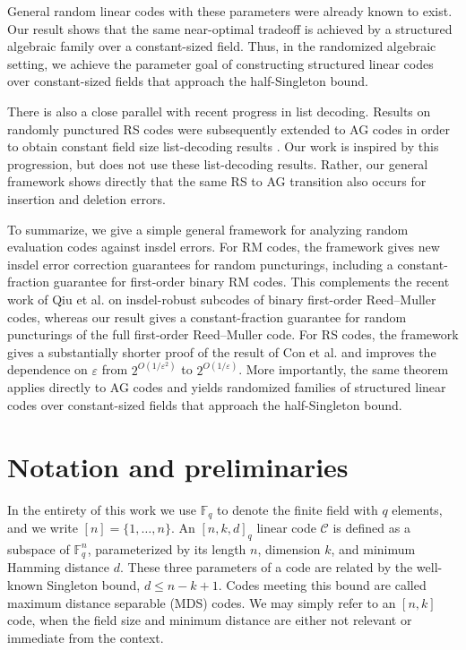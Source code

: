 \documentclass[draft, onecolumn, 11pt]{IEEEtran}
\newcommand{\F}{\mathbb{F}}
\begin{document}
General random linear codes with these parameters were already known to exist. Our result shows that the same near-optimal tradeoff is achieved by a structured algebraic family over a constant-sized field. Thus, in the randomized algebraic setting, we achieve the parameter goal of constructing structured linear codes over constant-sized fields that approach the half-Singleton bound.

There is also a close parallel with recent progress in list decoding. Results on randomly punctured RS codes were subsequently extended to AG codes in order to obtain constant field size list-decoding results \cite{brakensiek2024ag}. Our work is inspired by this progression, but does not use these list-decoding results. Rather, our general framework shows directly that the same RS to AG transition also occurs for insertion and deletion errors.

To summarize, we give a simple general framework for analyzing random evaluation codes against insdel errors. For RM codes, the framework gives new insdel error correction guarantees for random puncturings, including a constant-fraction guarantee for first-order binary RM codes. This complements the recent work of Qiu et al. \cite{qiu2026binary} on insdel-robust subcodes of binary first-order Reed--Muller codes, whereas our result gives a constant-fraction guarantee for random puncturings of the full first-order Reed--Muller code. For RS codes, the framework gives a substantially shorter proof of the result of Con et al.\cite{con2024randomRS} and improves the dependence on $\varepsilon$ from $2^{O(1/\varepsilon^2)}$ to $2^{O(1/\varepsilon)}$. More importantly, the same theorem applies directly to AG codes and yields randomized families of structured linear codes over constant-sized fields that approach the half-Singleton bound.

\section{Notation and preliminaries}
In the entirety of this work we use $\F_q$ to denote the finite field with $q$ elements, and we write $[n] = \{1, \dots, n\}$. 
An $[n,k,d]_q$ linear code $\mathcal{C}$ is defined as a subspace of $\F_q^n$, parameterized by its length $n$, dimension $k$, and minimum Hamming distance $d$. These three parameters of a code are related by the well-known Singleton bound, $d \leq n - k + 1$. Codes meeting this bound are called maximum distance separable (MDS) codes. We may simply refer to an $[n,k]$ code, when the field size and minimum distance are either not relevant or immediate from the context.
\end{document}
